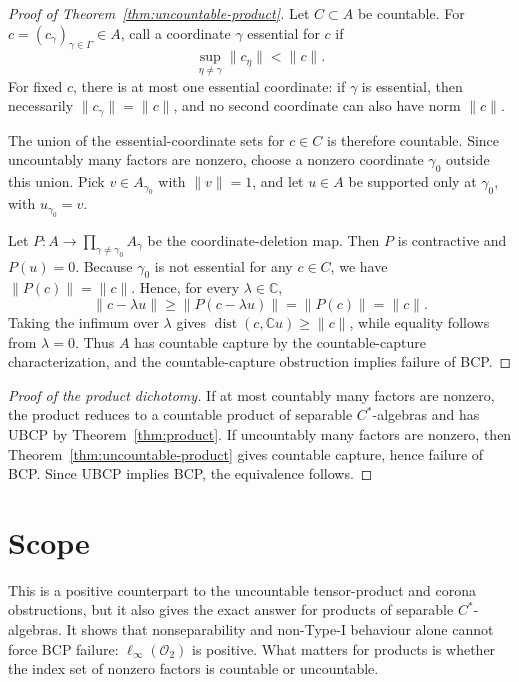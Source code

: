 \documentclass[11pt]{article}
\begin{document}
\begin{proof}[Proof of Theorem~\ref{thm:uncountable-product}]
Let \(C\subset A\) be countable.  For \(c=(c_\gamma)_{\gamma\in\Gamma}\in A\),
call a coordinate \(\gamma\) essential for \(c\) if
\[
        \sup_{\eta\ne\gamma}\|c_\eta\|<\|c\|.
\]
For fixed \(c\), there is at most one essential coordinate: if \(\gamma\) is
essential, then necessarily \(\|c_\gamma\|=\|c\|\), and no second coordinate
can also have norm \(\|c\|\).

The union of the essential-coordinate sets for \(c\in C\) is therefore
countable.  Since uncountably many factors are nonzero, choose a nonzero
coordinate \(\gamma_0\) outside this union.  Pick \(v\in A_{\gamma_0}\) with
\(\|v\|=1\), and let \(u\in A\) be supported only at \(\gamma_0\), with
\(u_{\gamma_0}=v\).

Let \(P:A\to\prod_{\gamma\ne\gamma_0}A_\gamma\) be the coordinate-deletion
map.  Then \(P\) is contractive and \(P(u)=0\).  Because \(\gamma_0\) is not
essential for any \(c\in C\), we have \(\|P(c)\|=\|c\|\).  Hence, for every
\(\lambda\in\mathbb C\),
\[
        \|c-\lambda u\|\ge \|P(c-\lambda u)\|=\|P(c)\|=\|c\|.
\]
Taking the infimum over \(\lambda\) gives \(\operatorname{dist}(c,\mathbb C
u)\ge\|c\|\), while equality follows from \(\lambda=0\).  Thus \(A\) has
countable capture by the countable-capture characterization, and the
countable-capture obstruction implies failure of BCP.
\end{proof}

\begin{proof}[Proof of the product dichotomy]
If at most countably many factors are nonzero, the product reduces to a
countable product of separable \(C^*\)-algebras and has UBCP by
Theorem~\ref{thm:product}.  If uncountably many factors are nonzero, then
Theorem~\ref{thm:uncountable-product} gives countable capture, hence failure
of BCP.  Since UBCP implies BCP, the equivalence follows.
\end{proof}

\section*{Scope}

This is a positive counterpart to the uncountable tensor-product and corona
obstructions, but it also gives the exact answer for products of separable
\(C^*\)-algebras.  It shows that nonseparability and non-Type-I behaviour
alone cannot force BCP failure: \(\ell_\infty(\mathcal O_2)\) is positive.
What matters for products is whether the index set of nonzero factors is
countable or uncountable.
\end{document}
